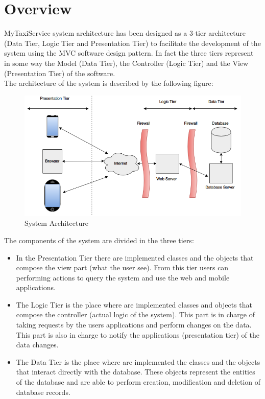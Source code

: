 \documentclass[../../../../dd.tex]{subfiles}
\begin{document}
	\section{Overview}
		MyTaxiService system architecture has been designed as a 3-tier architecture (Data Tier, Logic Tier and Presentation Tier) to facilitate the development of the system using the MVC software design pattern. In fact the three tiers represent in some way the Model (Data Tier), the Controller (Logic Tier) and the View (Presentation Tier) of the software.
		\\
		The architecture of the system is described by the following figure:
		\begin{figure}[H]
			\centering
			\includegraphics[width=\textwidth, scale=0.5]{../../rasd/IMG/ServerArchitecture.png}
			\caption{System Architecture}\label{fig:SystemArchitecture}
		\end{figure}
		The components of the system are divided in the three tiers:
		\begin{itemize}
			\item In the Presentation Tier there are implemented classes and the objects that compose the view part (what the user see). From this tier users can performing actions to query the system and use the web and mobile applications.
			\item The Logic Tier is the place where are implemented classes and objects that compose the controller (actual logic of the system). This part is in charge of taking requests by the users applications and perform changes on the data. This part is also in charge to notify the applications (presentation tier) of the data changes.
			\item The Data Tier is the place where are implemented the classes and the objects that interact directly with the database. These objects represent the entities of the database and are able to perform creation, modification and deletion of database records.
		\end{itemize}
\end{document}

